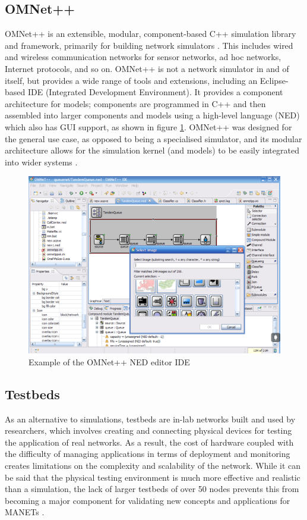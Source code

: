\subsection{OMNet++}
OMNet++ is an extensible, modular, component-based C++ simulation library and framework, primarily for building network simulators \cite{omnet2016}. This includes wired and wireless communication networks for sensor networks, ad hoc networks, Internet protocols, and so on. OMNet++ is not a network simulator in and of itself, but provides a wide range of tools and extensions, including an Eclipse-based IDE (Integrated Development Environment). It provides a component architecture for models; components are programmed in C++ and then assembled into larger components and models using a high-level language (NED) which also has GUI support, as shown in figure \ref{omnet}. OMNet++ was designed for the general use case, as opposed to being a specialised simulator, and its modular architecture allows for the simulation kernel (and models) to be easily integrated into wider systems \cite{varga2008}. 

\begin{figure}
\centering	
\includegraphics[scale=0.7]{img/omnet}	
\caption{Example of the OMNet++ NED editor IDE}
\label{omnet}
\end{figure}

\subsection{Testbeds}
As an alternative to simulations, testbeds are in-lab networks built and used by researchers, which involves creating and connecting physical devices for testing the application of real networks. As a result, the cost of hardware coupled with the difficulty of managing applications in terms of deployment and monitoring creates limitations on the complexity and scalability of the network. While it can be said that the physical testing environment is much more effective and realistic than a simulation, the lack of larger testbeds of over 50 nodes prevents this from becoming a major component for validating new concepts and applications for MANETs \cite{luchogie2006}.


